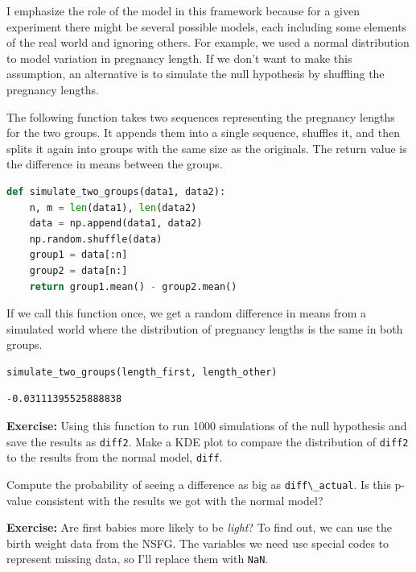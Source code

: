 I emphasize the role of the model in this framework because for a given
experiment there might be several possible models, each including some
elements of the real world and ignoring others. For example, we used a
normal distribution to model variation in pregnancy length. If we don't
want to make this assumption, an alternative is to simulate the null
hypothesis by shuffling the pregnancy lengths.

The following function takes two sequences representing the pregnancy
lengths for the two groups. It appends them into a single sequence,
shuffles it, and then splits it again into groups with the same size as
the originals. The return value is the difference in means between the
groups.

\begin{lstlisting}[language=Python,style=source]
def simulate_two_groups(data1, data2):
    n, m = len(data1), len(data2)
    data = np.append(data1, data2)
    np.random.shuffle(data)
    group1 = data[:n]
    group2 = data[n:]
    return group1.mean() - group2.mean()
\end{lstlisting}

If we call this function once, we get a random difference in means from
a simulated world where the distribution of pregnancy lengths is the
same in both groups.

\begin{lstlisting}[language=Python,style=source]
simulate_two_groups(length_first, length_other)
\end{lstlisting}

\begin{lstlisting}[style=output]
-0.03111395525888838
\end{lstlisting}

\textbf{Exercise:} Using this function to run 1000 simulations of the
null hypothesis and save the results as \passthrough{\lstinline!diff2!}.
Make a KDE plot to compare the distribution of
\passthrough{\lstinline!diff2!} to the results from the normal model,
\passthrough{\lstinline!diff!}.

Compute the probability of seeing a difference as big as
\passthrough{\lstinline!diff\_actual!}. Is this p-value consistent with
the results we got with the normal model?

\textbf{Exercise:} Are first babies more likely to be \emph{light}? To
find out, we can use the birth weight data from the NSFG. The variables
we need use special codes to represent missing data, so I'll replace
them with \passthrough{\lstinline!NaN!}.

